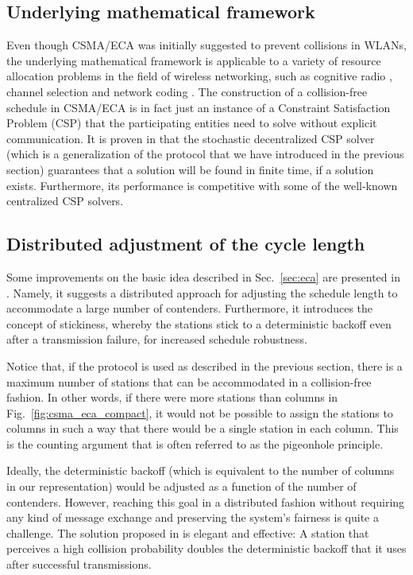 \documentclass[journal]{IEEEtran}
\begin{document}
\subsection{Underlying mathematical framework}
Even though CSMA/ECA was initially suggested to prevent collisions in WLANs, the underlying mathematical framework is applicable to a variety of resource allocation problems in the field of wireless networking, such as cognitive radio \cite{khan2013aso}, channel selection and network coding \cite{duffy2011dcs}.
The construction of a collision-free schedule in CSMA/ECA is in fact just an instance of a Constraint Satisfaction Problem (CSP) that the participating entities need to solve without explicit communication.
It is proven in \cite{duffy2011dcs} that the stochastic decentralized CSP solver (which is a generalization of the protocol that we have introduced in the previous section) guarantees that a solution will be found in finite time, if a solution exists.
Furthermore, its performance is competitive with some of the well-known centralized CSP solvers.

\subsection{Distributed adjustment of the cycle length}

Some improvements on the basic idea described in Sec.~\ref{sec:eca} are presented in \cite{fang2011dlm}. 
Namely, it suggests a distributed approach for adjusting the schedule length to accommodate a large number of contenders.
Furthermore, it introduces the concept of stickiness, whereby the stations stick to a deterministic backoff even after a transmission failure, for increased schedule robustness. 

Notice that, if the protocol is used as described in the previous section, there is a maximum number of stations that can be accommodated in a collision-free fashion.
In other words, if there were more stations than columns in Fig.~\ref{fig:csma_eca_compact}, it would not be possible to assign the stations to columns in such a way that there would be a single station in each column.
This is the counting argument that is often referred to as the pigeonhole principle.

Ideally, the deterministic backoff (which is equivalent to the number of columns in our representation) would be adjusted as a function of the number of contenders.
However, reaching this goal in a distributed fashion without requiring any kind of message exchange and preserving the system's fairness is quite a challenge.
The solution proposed in \cite{fang2011dlm} is elegant and effective:
A station that perceives a high collision probability doubles the deterministic backoff that it uses after successful transmissions.
\end{document}

